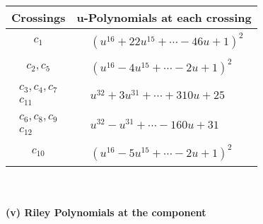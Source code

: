 \documentclass[1p]{elsarticle_modified}
\theoremstyle{definition}
\begin{document}
\begin{tabular}{m{50pt}|m{274pt}}
Crossings & \hspace{64pt}u-Polynomials at each crossing \\
\hline $$\begin{aligned}c_{1}\end{aligned}$$&$\begin{aligned}
&(u^{16}+22 u^{15}+\cdots-46 u+1)^{2}
\end{aligned}$\\
\hline $$\begin{aligned}c_{2},c_{5}\end{aligned}$$&$\begin{aligned}
&(u^{16}-4 u^{15}+\cdots-2 u+1)^{2}
\end{aligned}$\\
\hline $$\begin{aligned}c_{3},c_{4},c_{7}\\c_{11}\end{aligned}$$&$\begin{aligned}
&u^{32}+3 u^{31}+\cdots+310 u+25
\end{aligned}$\\
\hline $$\begin{aligned}c_{6},c_{8},c_{9}\\c_{12}\end{aligned}$$&$\begin{aligned}
&u^{32}- u^{31}+\cdots-160 u+31
\end{aligned}$\\
\hline $$\begin{aligned}c_{10}\end{aligned}$$&$\begin{aligned}
&(u^{16}-5 u^{15}+\cdots-2 u+1)^{2}
\end{aligned}$\\
\hline
\end{tabular}\\~\\
\newpage\renewcommand{\arraystretch}{1}
\flushleft \textbf{(v) Riley Polynomials at the component}\newline \\
\end{document}

